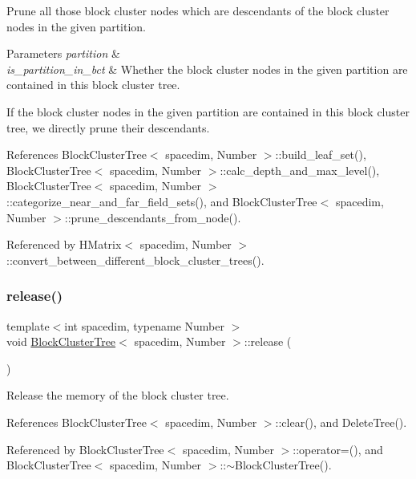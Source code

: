 Prune all those block cluster nodes which are descendants of the block cluster nodes in the given partition.


\begin{DoxyParams}{Parameters}
{\em partition} & \\
\hline
{\em is\+\_\+partition\+\_\+in\+\_\+bct} & Whether the block cluster nodes in the given {\ttfamily partition} are contained in this block cluster tree. \\
\hline
\end{DoxyParams}
If the block cluster nodes in the given {\ttfamily partition} are contained in this block cluster tree, we directly prune their descendants.

References Block\+Cluster\+Tree$<$ spacedim, Number $>$\+::build\+\_\+leaf\+\_\+set(), Block\+Cluster\+Tree$<$ spacedim, Number $>$\+::calc\+\_\+depth\+\_\+and\+\_\+max\+\_\+level(), Block\+Cluster\+Tree$<$ spacedim, Number $>$\+::categorize\+\_\+near\+\_\+and\+\_\+far\+\_\+field\+\_\+sets(), and Block\+Cluster\+Tree$<$ spacedim, Number $>$\+::prune\+\_\+descendants\+\_\+from\+\_\+node().



Referenced by H\+Matrix$<$ spacedim, Number $>$\+::convert\+\_\+between\+\_\+different\+\_\+block\+\_\+cluster\+\_\+trees().

\mbox{\label{classBlockClusterTree_a0415fe94fd480bbb985a45dc691e2bed}} 
\subsubsection{\texorpdfstring{release()}{release()}}
{\footnotesize\ttfamily template$<$int spacedim, typename Number $>$ \\
void \hyperlink{classBlockClusterTree}{Block\+Cluster\+Tree}$<$ spacedim, Number $>$\+::release (\begin{DoxyParamCaption}{ }\end{DoxyParamCaption})}

Release the memory of the block cluster tree. 

References Block\+Cluster\+Tree$<$ spacedim, Number $>$\+::clear(), and Delete\+Tree().



Referenced by Block\+Cluster\+Tree$<$ spacedim, Number $>$\+::operator=(), and Block\+Cluster\+Tree$<$ spacedim, Number $>$\+::$\sim$\+Block\+Cluster\+Tree().

